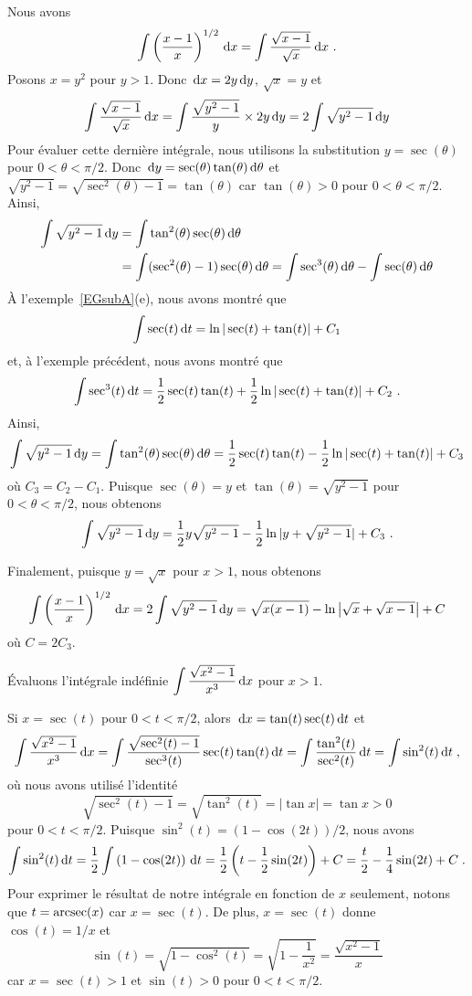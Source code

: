 {\begin{egg}
Nous avons
\[
\int \left(\frac{x-1}{x}\right)^{1/2} \,\mathrm{d}x
= \int \frac{\sqrt{x-1}}{\sqrt{x}} \,\mathrm{d}x \ .
\]
Posons $x=y^2$ pour $y>1$.  Donc $\,\mathrm{d}x = 2 y \,\mathrm{d}y$, 
$\sqrt{x} = y$ et
\[
\int \frac{\sqrt{x-1}}{\sqrt{x}} \,\mathrm{d}x
= \int \frac{\sqrt{y^2-1}}{y} \times 2y \,\mathrm{d}y
= 2 \int \sqrt{y^2-1} \,\mathrm{d}y
\]
Pour évaluer cette dernière intégrale, nous utilisons la substitution
$y=\sec(\theta)$ pour $0<\theta<\pi/2$.  Donc
$\,\mathrm{d}y = \sec(\theta)\tan(\theta)\,\mathrm{d}\theta$ et
$\displaystyle \sqrt{y^2-1} = \sqrt{\sec^2(\theta)-1} = \tan(\theta)$ 
car $\tan(\theta)>0$ pour $0<\theta<\pi/2$.  Ainsi,
\begin{align*}
\int \sqrt{y^2-1} \,\mathrm{d}y &= \int \tan^2(\theta)\sec(\theta)\,\mathrm{d}\theta \\
&= \int (\sec^2(\theta)-1) \sec(\theta)\,\mathrm{d}\theta 
= \int \sec^3(\theta)\,\mathrm{d}\theta - \int \sec(\theta)\,\mathrm{d}\theta 
\end{align*}
À l'exemple~\ref{EGsubA}(e), nous avons montré que
\[
\int \sec(t) \,\mathrm{d}t = \ln|\sec(t)+\tan(t)| + C_1
\]
et, à l'exemple précédent, nous avons montré que
\[
\int \sec^3(t) \,\mathrm{d}t = \frac{1}{2}\sec(t) \tan(t) + \frac{1}{2}
\ln|\sec(t)+\tan(t)| + C_2 \ .
\]
Ainsi,
\[
\int \sqrt{y^2-1} \,\mathrm{d}y
= \int \tan^2(\theta)\sec(\theta)\,\mathrm{d}\theta
= \frac{1}{2}\sec(t) \tan(t) - \frac{1}{2}
\ln|\sec(t)+\tan(t)| + C_3
\]
où $C_3 = C_2 - C_1$.  Puisque $\sec(\theta) =y$ et
$\tan(\theta) = \sqrt{y^2-1}$ pour $0<\theta<\pi/2$, nous obtenons
\[
\int \sqrt{y^2-1} \,\mathrm{d}y = \frac{1}{2}y\sqrt{y^2-1} -
\frac{1}{2} \ln|y+\sqrt{y^2-1}| + C_3 \ .
\]

Finalement, puisque $y=\sqrt{x}$ pour $x>1$, nous obtenons
\[
\int \left(\frac{x-1}{x}\right)^{1/2} \,\mathrm{d}x
= 2 \int \sqrt{y^2-1} \,\mathrm{d}y
= \sqrt{x(x-1)}- \ln\left|\sqrt{x} + \sqrt{x-1}\right| + C
\]
où $C= 2C_3$.
\end{egg}

\begin{egg}
Évaluons l'intégrale indéfinie 
$\displaystyle \int \frac{\sqrt{x^2-1}}{x^3}  \,\mathrm{d}x$ pour
$x>1$.

Si $x = \sec(t)$ pour $0 < t < \pi/2$, alors
$\,\mathrm{d}x = \tan(t)\sec(t) \,\mathrm{d}t$ et
\[
\int \frac{\sqrt{x^2-1}}{x^3} \,\mathrm{d}x
= \int \frac{\sqrt{\sec^2(t) -1}}{\sec^3(t)} \sec(t)\tan(t) \,\mathrm{d}t
= \int \frac{\tan^2(t)}{\sec^2(t)} \,\mathrm{d}t
= \int \sin^2(t) \,\mathrm{d}t \; ,
\]
où nous avons utilisé l'identité
\[
\sqrt{\sec^2(t) -1} = \sqrt{\tan^2(t)} = |\tan{x}| = \tan{x} > 0
\]
pour $0< t < \pi/2$.  Puisque $\sin^2(t) = (1-\cos(2t))/2$, nous avons
\[
\int \sin^2(t)  \,\mathrm{d}t = \frac{1}{2} \int \left( 1- \cos(2t)\right) \,\mathrm{d}t
= \frac{1}{2}\left( t - \frac{1}{2}\sin(2t) \right) + C
= \frac{t}{2} - \frac{1}{4}\sin(2t) + C \; .
\]
Pour exprimer le résultat de notre intégrale en fonction de $x$
seulement, notons que $t=\operatorname{arcsec}(x)$ car $x=\sec(t)$.  De plus,
$x = \sec(t)$ donne $\cos(t) = 1/x$ et
\[
\sin(t) = \sqrt{1-\cos^2(t)} = \sqrt{1-\frac{1}{x^2}}
= \frac{\sqrt{x^2 - 1}}{x}
\]
car $x = \sec(t) > 1$ et $\sin(t) > 0$ pour $0< t < \pi/2$.


\end{egg}}
